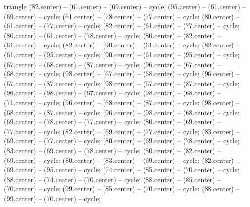 {\begin{pgfonlayer}{triangle}
 (82.center) -- (61.center) -- (69.center) -- cycle; 
 (95.center) -- (61.center) -- (69.center) -- cycle; 
 (61.center) -- (78.center) -- (77.center) -- cycle; 
 (80.center) -- (61.center) -- (77.center) -- cycle; 
 (82.center) -- (61.center) -- (77.center) -- cycle; 
 (80.center) -- (61.center) -- (78.center) -- cycle; 
 (80.center) -- (82.center) -- (61.center) -- cycle; 
 (82.center) -- (90.center) -- (61.center) -- cycle; 
 (82.center) -- (61.center) -- (95.center) -- cycle; 
 (90.center) -- (61.center) -- (95.center) -- cycle; 
 (67.center) -- (68.center) -- (87.center) -- cycle; 
 (96.center) -- (67.center) -- (68.center) -- cycle; 
 (98.center) -- (67.center) -- (68.center) -- cycle; 
 (96.center) -- (67.center) -- (87.center) -- cycle; 
 (98.center) -- (67.center) -- (87.center) -- cycle; 
 (96.center) -- (98.center) -- (67.center) -- cycle; 
 (98.center) -- (68.center) -- (71.center) -- cycle; 
 (96.center) -- (68.center) -- (87.center) -- cycle; 
 (98.center) -- (68.center) -- (87.center) -- cycle; 
 (96.center) -- (98.center) -- (68.center) -- cycle; 
 (69.center) -- (78.center) -- (77.center) -- cycle; 
 (80.center) -- (69.center) -- (77.center) -- cycle; 
 (82.center) -- (69.center) -- (77.center) -- cycle; 
 (83.center) -- (69.center) -- (77.center) -- cycle; 
 (80.center) -- (69.center) -- (78.center) -- cycle; 
 (83.center) -- (69.center) -- (78.center) -- cycle; 
 (80.center) -- (82.center) -- (69.center) -- cycle; 
 (80.center) -- (83.center) -- (69.center) -- cycle; 
 (82.center) -- (69.center) -- (95.center) -- cycle; 
 (74.center) -- (85.center) -- (70.center) -- cycle; 
 (88.center) -- (74.center) -- (70.center) -- cycle; 
 (88.center) -- (85.center) -- (70.center) -- cycle; 
 (99.center) -- (85.center) -- (70.center) -- cycle; 
 (88.center) -- (99.center) -- (70.center) -- cycle; 

\end{pgfonlayer}}
